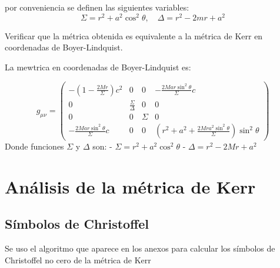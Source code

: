 por conveniencia se definen las siguientes variables:
\begin{equation}
    \Sigma = r^2 + a^2 \cos^2 \theta, \quad \Delta = r^2 - 2 m r + a^2
\end{equation}



\begin{task}
    Verificar que la métrica obtenida es equivalente a la métrica de Kerr en coordenadas de Boyer-Lindquist.

\end{task}
La mewtrica en coordenadas de Boyer-Lindquist es:

\begin{equation}
    g_{\mu \nu}=\left(\begin{array}{cccc}
-\left(1-\frac{2 M r}{\Sigma}\right) c^2 & 0 & 0 & -\frac{2 M a r \sin ^2 \theta}{\Sigma} c \\
0 & \frac{\Sigma}{\Delta} & 0 & 0 \\
0 & 0 & \Sigma & 0 \\
-\frac{2 M a r \sin ^2 \theta}{\Sigma} c & 0 & 0 & \left(r^2+a^2+\frac{2 M r a^2 \sin ^2 \theta}{\Sigma}\right) \sin ^2 \theta
\end{array}\right)
    \label{eq:MetricaKerrBL}
\end{equation}
Donde funciones $\Sigma$ y $\Delta$ son:
- $\Sigma=r^2+a^2 \cos ^2 \theta$
- $\Delta=r^2-2 M r+a^2$

\section{Análisis de la métrica de Kerr}
\subsection{Símbolos de Christoffel}
Se uso el algoritmo que aparece en los anexos para calcular los símbolos de Christoffel no cero de la métrica de Kerr
